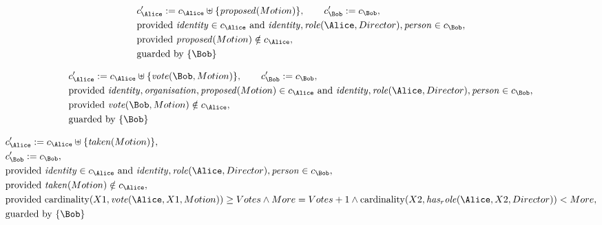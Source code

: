 \begin{align*}
&
c'_
{
\Alice
}
 := 
c_
{
\Alice
}
 \uplus 
\{
\mathit{
proposed
}
(
Motion
)
\}
, \qquad 
c'_
{
\Bob
}
 := 
c_
{
\Bob
}
,\\
&
\text{provided } 
\mathit{
identity
}
 \in c_
{
\Alice
}
 \text{ and } 
\mathit{
identity
}
,
\mathit{
role
}
(
\Alice
,
Director
)
,
\mathit{
person
}
 \in c_
{
\Bob
}
,\\
&
\text{provided } 
\mathit{
proposed
}
(
Motion
)
 \notin c_
{
\Alice
}
,\\
&
\text{guarded by } \{
\Bob
\}
\end{align*}

\begin{align*}
&
c'_
{
\Alice
}
 := 
c_
{
\Alice
}
 \uplus 
\{
\mathit{
vote
}
(
\Bob
,
Motion
)
\}
, \qquad 
c'_
{
\Bob
}
 := 
c_
{
\Bob
}
,\\
&
\text{provided } 
\mathit{
identity
}
,
\mathit{
organisation
}
,
\mathit{
proposed
}
(
Motion
)
 \in c_
{
\Alice
}
 \text{ and } 
\mathit{
identity
}
,
\mathit{
role
}
(
\Alice
,
Director
)
,
\mathit{
person
}
 \in c_
{
\Bob
}
,\\
&
\text{provided } 
\mathit{
vote
}
(
\Bob
,
Motion
)
 \notin c_
{
\Alice
}
,\\
&
\text{guarded by } \{
\Bob
\}
\end{align*}

\begin{align*}
&
c'_
{
\Alice
}
 := 
c_
{
\Alice
}
 \uplus 
\{
\mathit{
taken
}
(
Motion
)
\}
,\\
&
c'_
{
\Bob
}
 := 
c_
{
\Bob
}
,\\
&
\text{provided } 
\mathit{
identity
}
 \in c_
{
\Alice
}
 \text{ and } 
\mathit{
identity
}
,
\mathit{
role
}
(
\Alice
,
Director
)
,
\mathit{
person
}
 \in c_
{
\Bob
}
,\\
&
\text{provided } 
\mathit{
taken
}
(
Motion
)
 \notin c_
{
\Alice
}
,\\
&
\text{provided } 
\mathrm{cardinality}(
X1
,
\mathit{
vote
}
(
\Alice
,
X1
,
Motion
)
)
\ge
Votes
\land
More
=
Votes
+
1
\land
\mathrm{cardinality}(
X2
,
\mathit{
has_role
}
(
\Alice
,
X2
,
Director
)
)
<
More
,\\
&
\text{guarded by } \{
\Bob
\}
\end{align*}

